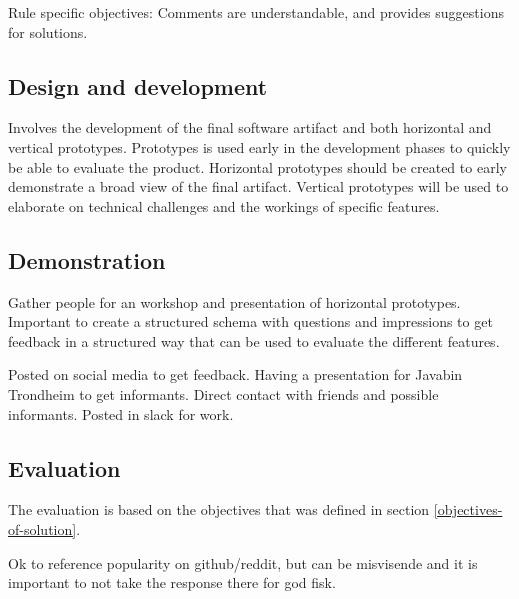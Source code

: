 \documentclass{article}
\begin{document}


Rule specific objectives: 
Comments are understandable, and provides suggestions for solutions.

\subsection{Design and development}

Involves the development of the final software artifact and both horizontal and vertical prototypes. Prototypes is used early in the development phases to quickly be able to evaluate the product. Horizontal prototypes should be created to early demonstrate a broad view of the final artifact. Vertical prototypes will be used to elaborate on technical challenges and the workings of specific features. 
 
\subsection{Demonstration}
Gather people for an workshop and presentation of horizontal prototypes. Important to create a structured schema with questions and impressions to get feedback in a structured way that can be used to evaluate the different features.

Posted on social media to get feedback. Having a presentation for Javabin Trondheim to get informants. Direct contact with friends and possible informants. Posted in slack for work.
 
\subsection{Evaluation}

The evaluation is based on the objectives that was defined in section \ref{objectives-of-solution}.

Ok to reference popularity on github/reddit, but can be misvisende and it is important to not take the response there for god fisk.
\end{document}
